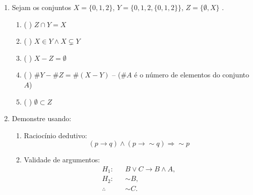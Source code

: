\documentclass[a4paper,12pt]{letter}  %
\begin{document}
\begin{enumerate}
    \item Sejam os conjuntos $X=\{0,1,2\}$, $Y = \{0,1,2,\{0,1,2\}\}$, $Z=\{\emptyset, X\}$ . 		      
        \begin{enumerate}
            \item ( ) $Z \cap Y = X$
            \item ( ) $X \in Y \wedge X \subsetneq Y$
            \item ( ) $X - Z = \emptyset$
            \item ( ) $\#Y - \#Z = \#(X-Y)$  -- ($\#A$ é o número de elementos do conjunto $A$)
            \item ( ) $ \emptyset \subset Z$
        \end{enumerate}

    \item Demonstre usando:
    \begin{enumerate}
        \item Raciocínio dedutivo: 
         $$  (p \rightarrow q) \land (p \rightarrow \sim q) \Rightarrow \sim p $$
        \item Validade de argumentos: 
            \begin{align*}
	            H_1:& &B \lor C \rightarrow  B \land A,\\
	            H_2:& &\sim B,\\
	            \therefore & & \sim C.
	        \end{align*}
    \end{enumerate}
           
\end{enumerate}
\end{document}

